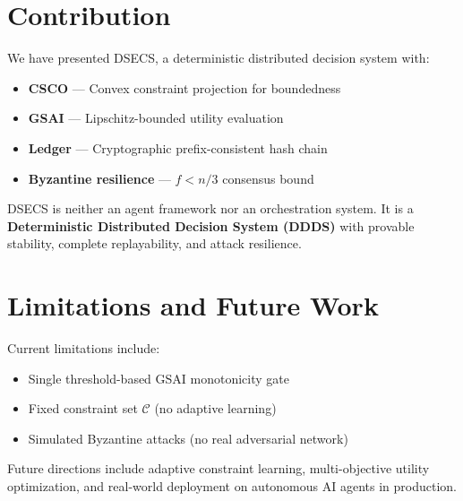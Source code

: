 \documentclass{article}
\begin{document}
\section{Contribution}

We have presented DSECS, a deterministic distributed decision system with:

\begin{itemize}
    \item \textbf{CSCO} — Convex constraint projection for boundedness
    \item \textbf{GSAI} — Lipschitz-bounded utility evaluation
    \item \textbf{Ledger} — Cryptographic prefix-consistent hash chain
    \item \textbf{Byzantine resilience} — $f < n/3$ consensus bound
\end{itemize}

DSECS is neither an agent framework nor an orchestration system.
It is a \textbf{Deterministic Distributed Decision System (DDDS)} with
provable stability, complete replayability, and attack resilience.

\section{Limitations and Future Work}

Current limitations include:
\begin{itemize}
    \item Single threshold-based GSAI monotonicity gate
    \item Fixed constraint set $\mathcal{C}$ (no adaptive learning)
    \item Simulated Byzantine attacks (no real adversarial network)
\end{itemize}

Future directions include adaptive constraint learning, multi-objective
utility optimization, and real-world deployment on autonomous AI agents
in production.



\end{document}
